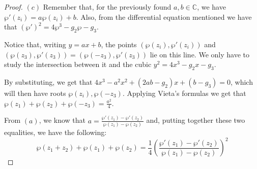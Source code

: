 \documentclass{article}
\newcommand{\numberset}{\mathbb}
\newcommand{\C}{\numberset{C}}
\begin{document}
\begin{proof}
	$(c)$ Remember that, for the previously found $a,b\in\C$, we have $\wp'(z_i)=a\wp(z_i)+b$. Also, from the differential equation mentioned we have that $(\wp')^2=4\wp^3-g_2\wp-g_3$.
	
	Notice that, writing $y=ax+b$, the points $(\wp(z_i),\wp'(z_i))$ and
        $(\wp(z_3),\wp'(z_3))=(\wp(-z_3),\wp'(z_3))$ lie on this line. We only have to study the intersection between it and the cubic $y^2=4x^3-g_2x-g_3$.
	
	By substituting, we get that $4x^3-a^2x^2+(2ab-g_2)x+(b-g_3)=0$, which will then have roots $\wp(z_i),\wp(-z_3)$. Applying Vieta's formulas we get that $\wp(z_1)+\wp(z_2)+\wp(-z_3)=\frac{a^2}{4}$.
	
	From $(a)$, we know that $a=\frac{\wp'(z_1)-\wp'(z_2)}{\wp(z_1)-\wp(z_2)}$ and, putting together these two equalities, we have the following:$$\wp(z_1+z_2)+\wp(z_1)+\wp(z_2)=\frac{1}{4}\left(\frac{\wp'(z_1)-\wp'(z_2)}{\wp(z_1)-\wp(z_2)}\right)^2$$
\end{proof}

\printbibliography
\end{document}
